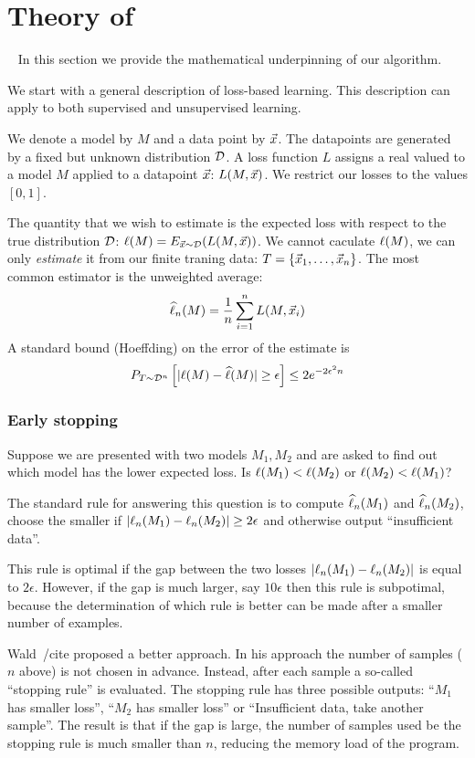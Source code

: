 \section{Theory of \tmsn}~\label{sec:theory}
In this section we provide the mathematical underpinning of our algorithm.

We start with a general description of loss-based learning. This
description can apply to both supervised and unsupervised learning.

We denote a model by $M$ and a data point by $\vec{x}$. The datapoints are
generated by a fixed but unknown distribution ${\cal D}$. A loss function $L$
assigns a real valued to a model $M$ applied to a datapoint $\vec{x}$:
$L(M,\vec{x})$. We restrict our losses to the values $[0,1]$.

The quantity that we wish to estimate is the expected loss with
respect to the true distribution ${\cal D}$: $\ell(M) = E_{\vec{x} \sim
  {\cal D}}(L(M,\vec{x}))$. We cannot caculate $\ell(M)$, we can only
{\em estimate} it from our finite traning data: $T = \{ \vec{x}_1, \ldots,
\vec{x}_n\}$. The most common estimator is the unweighted average:
$$ \widehat{\ell}_n(M) = \frac{1}{n} \sum_{i=1}^n L(M,\vec{x}_i)$$
A standard bound (Hoeffding) on the error of the estimate is
\begin{equation} \label{eqn:hoeffding}
P_{T \sim {\cal D}^n}\left[|\ell(M) - \widehat{\ell}(M)| \geq \epsilon \right] \leq
2e^{-2 \epsilon^2 n}
\end{equation}

\subsubsection*{Early stopping}
Suppose we are presented with two models $M_1,M_2$ and are asked to
find out which model has the lower expected loss. Is 
$\ell(M_1)<\ell(M_2)$ or $\ell(M_2)<\ell(M_1)$?

The standard rule for answering this question is to compute
$\widehat{\ell}_n(M_1)$ and $\widehat{\ell}_n(M_2)$, choose the smaller if
$|\ell_n(M_1)-\ell_n(M_2)| \geq 2\epsilon$ and otherwise output
``insufficient data''.

This rule is optimal if the gap between the two losses
$|\ell_n(M_1)-\ell_n(M_2)|$ is equal to $2\epsilon$. However, if the
gap is much larger, say $10\epsilon$ then this rule is subpotimal,
because the determination of which rule is better can be made after a
smaller number of examples.

Wald~/cite{} proposed a better approach. In his approach the number of
samples ($n$ above) is not chosen in advance. Instead, after each sample a
so-called ``stopping rule'' is evaluated. The stopping rule has three
possible outputs: ``$M_1$ has smaller loss'', ``$M_2$ has smaller
loss'' or ``Insufficient data, take another sample''. The result is
that if the gap is large, the number of samples used be the stopping
rule is much smaller than $n$, reducing the memory load of the program.

